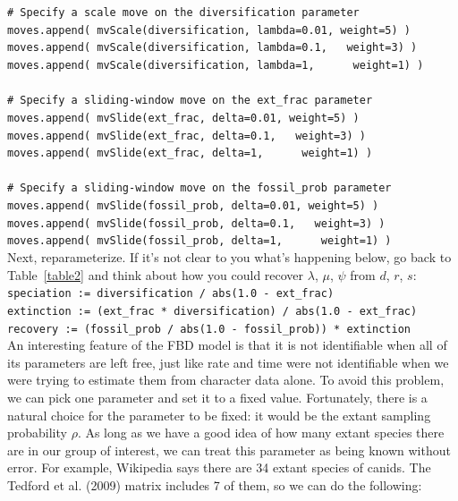 \documentclass[12pt]{article}
\begin{document}
\indent \texttt{\# Specify a scale move on the diversification parameter} \\
\indent \texttt{moves.append( mvScale(diversification, lambda=0.01, weight=5) )} \\
\indent \texttt{moves.append( mvScale(diversification, lambda=0.1,\ \,\ weight=3) )} \\
\indent \texttt{moves.append( mvScale(diversification, lambda=1,\ \ \ \,\,\ weight=1) )} \\
\ \\
\indent \texttt{\# Specify a sliding-window move on the ext\_frac parameter} \\
\indent \texttt{moves.append( mvSlide(ext\_frac, delta=0.01, weight=5) )} \\
\indent \texttt{moves.append( mvSlide(ext\_frac, delta=0.1,\ \,\ weight=3) )} \\
\indent \texttt{moves.append( mvSlide(ext\_frac, delta=1,\ \ \ \,\,\ weight=1) )} \\
\ \\
\indent \texttt{\# Specify a sliding-window move on the fossil\_prob parameter} \\
\indent \texttt{moves.append( mvSlide(fossil\_prob, delta=0.01, weight=5) )} \\
\indent \texttt{moves.append( mvSlide(fossil\_prob, delta=0.1,\ \,\ weight=3) )} \\
\indent \texttt{moves.append( mvSlide(fossil\_prob, delta=1,\ \ \ \,\,\ weight=1) )} \\ 

\noindent Next, reparameterize. If it's not clear to you what's happening below, go back to Table~\ref{table2} and think about how you could recover $\lambda$, $\mu$, $\psi$ from $d$, $r$, $s$: \\

\indent \texttt{speciation := diversification / abs(1.0 - ext\_frac)} \\ 
\indent \texttt{extinction := (ext\_frac * diversification) / abs(1.0 - ext\_frac)} \\ 
\indent \texttt{recovery := (fossil\_prob / abs(1.0 - fossil\_prob)) * extinction} \\ 

\noindent An interesting feature of the FBD model is that it is not identifiable when all of its parameters are left free, just like rate and time were not identifiable when we were trying to estimate them from character data alone. To avoid this problem, we can pick one parameter and set it to a fixed value. Fortunately, there is a natural choice for the parameter to be fixed: it would be the extant sampling probability $\rho$. As long as we have a good idea of how many extant species there are in our group of interest, we can treat this parameter as being known without error. For example, Wikipedia says there are 34 extant species of canids. The Tedford et al. (2009) matrix includes 7 of them, so we can do the following: \\
\end{document}
